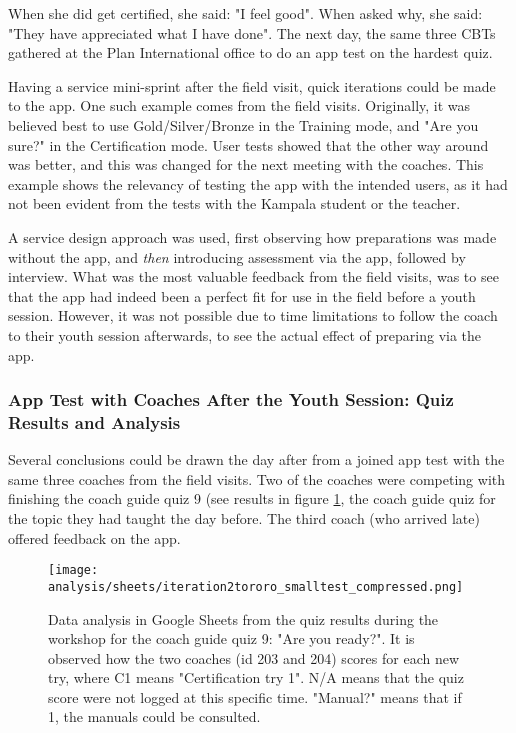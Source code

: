   When she did get certified, she said: "I feel good". When asked why, she said: "They have appreciated what I have done". The next day, the same three CBTs gathered at the Plan International office to do an app test on the hardest quiz.

  Having a service mini-sprint after the field visit, quick iterations could be made to the app. One such example comes from the field visits. Originally, it was believed best to use Gold/Silver/Bronze in the Training mode, and "Are you sure?" in the Certification mode. User tests showed that the other way around was better, and this was changed for the next meeting with the coaches. This example shows the relevancy of testing the app with the intended users, as it had not been evident from the tests with the Kampala student or the teacher.

  A service design approach was used, first observing how preparations was made without the app, and \textit{then} introducing assessment via the app, followed by interview. What was the most valuable feedback from the field visits, was to see that the app had indeed been a perfect fit for use in the field before a youth session. However, it was not possible due to time limitations to follow the coach to their youth session afterwards, to see the actual effect of preparing via the app.

  \subsubsection{App Test with Coaches After the Youth Session: Quiz Results and Analysis}

  Several conclusions could be drawn the day after from a joined app test with the same three coaches from the field visits. Two of the coaches were competing with finishing the coach guide quiz 9 (see results in figure \ref{fig:areYouReady}, the coach guide quiz for the topic they had taught the day before. The third coach (who arrived late) offered feedback on the app.

  \begin{figure}[h]
    \centering
    \texttt{[image: analysis/sheets/iteration2tororo\_smalltest\_compressed.png]}
    \caption{Data analysis in Google Sheets from the quiz results during the workshop for the coach guide quiz 9: "Are you ready?". It is observed how the two coaches (id 203 and 204) scores for each new try, where C1 means "Certification try 1". N/A means that the quiz score were not logged at this specific time. "Manual?" means that if 1, the manuals could be consulted.}
    \label{fig:areYouReady}
  \end{figure}

